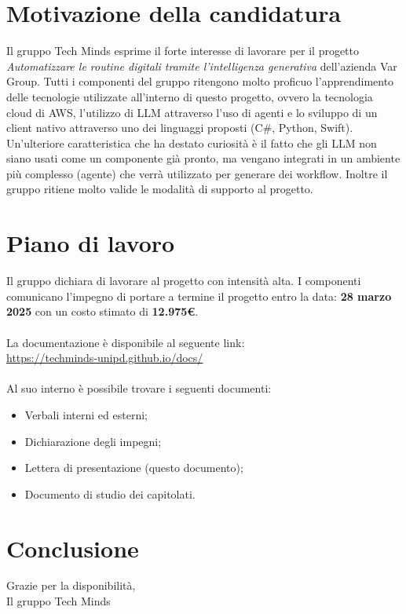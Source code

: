 \documentclass[10pt]{article}
\begin{document}
\newpage
\section{Motivazione della candidatura}
Il gruppo Tech Minds esprime il forte interesse di lavorare per il progetto \textit{Automatizzare le routine digitali tramite l’intelligenza generativa} dell'azienda Var Group.
Tutti i componenti del gruppo ritengono molto proficuo l'apprendimento delle tecnologie utilizzate all'interno di questo progetto, ovvero la tecnologia cloud di AWS, l'utilizzo di LLM attraverso l'uso di agenti e lo sviluppo di un client nativo attraverso uno dei linguaggi proposti (C\#, Python, Swift).
Un'ulteriore caratteristica che ha destato curiosità è il fatto che gli LLM non siano usati come un componente già pronto, ma vengano integrati in un ambiente più complesso (agente) che verrà utilizzato per generare dei workflow.
Inoltre il gruppo ritiene molto valide le modalità di supporto al progetto.

\section{Piano di lavoro}
Il gruppo dichiara di lavorare al progetto con intensità alta. I componenti comunicano l'impegno di portare a termine il progetto entro la data: \textbf{28 marzo 2025} con un costo stimato di \textbf{12.975\euro}.
\\\\La documentazione è disponibile al seguente link:\\
\url{https://techminds-unipd.github.io/docs/}
\\\\
Al suo interno è possibile trovare i seguenti documenti:
\begin{itemize}
    \item Verbali interni ed esterni;
    \item Dichiarazione degli impegni;
    \item Lettera di presentazione (questo documento);
    \item Documento di studio dei capitolati.
\end{itemize}

\section{Conclusione}
Grazie per la disponibilità,\\
Il gruppo Tech Minds
\end{document}
